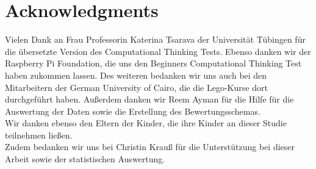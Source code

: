 \chapter{Acknowledgments}
Vielen Dank an Frau Professorin Katerina Tsarava der Universität Tübingen für die übersetzte Version des Computational Thinking Tests. Ebenso danken wir der Raspberry Pi Foundation, die uns den Beginners Computational Thinking Test haben zukommen lassen. Des weiteren bedanken wir uns auch bei den Mitarbeitern der German University of Cairo, die die Lego-Kurse dort durchgeführt haben. Außerdem danken wir Reem Ayman für die Hilfe für die Auswertung der Daten sowie die Erstellung des Bewertungsschemas.\\
Wir danken ebenso den Eltern der Kinder, die ihre Kinder an dieser Studie teilnehmen ließen.\\
Zudem bedanken wir uns bei Christin Krauß für die Unterstützung bei dieser Arbeit sowie der statistischen Auswertung.